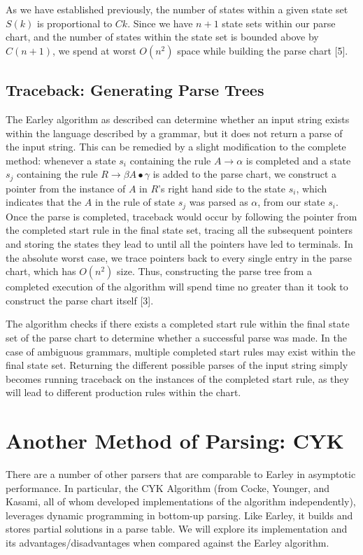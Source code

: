 \documentclass[a4paper, 11pt]{article}
\begin{document}
As we have established previously, the number of states within a given state set $S(k)$ is proportional to $Ck$. Since we have $n+1$ state sets within our parse chart, and the
number of states within the state set is bounded above by $C(n+1)$, we spend at worst $O(n^2)$ space while building the parse chart [5].

\subsection{Traceback: Generating Parse Trees}

The Earley algorithm as described can determine whether an input string exists within the language described by a grammar, but it does not return a parse of the input string.
This can be remedied by a slight modification to the complete method: whenever a state $s_i$ containing the rule $A \to \alpha$ is completed and a state $s_j$ containing the 
rule $R \to \beta A \bullet \gamma$ is added to the parse chart, we construct a pointer from the instance of $A$ in $R$'s right hand side to the state $s_i$, which indicates
that the $A$ in the rule of state $s_j$ was parsed as $\alpha$, from our state $s_i$. Once the parse is completed, traceback would occur by following the pointer from the
completed start rule in the final state set, tracing all the subsequent pointers and storing the states they lead to until all the pointers have led to terminals. 
In the absolute worst case, we trace pointers back to every single entry in the parse chart, which has $O(n^2)$ size. Thus, constructing the parse
tree from a completed execution of the algorithm will spend time no greater than it took to construct the parse chart itself [3].

The algorithm checks if there exists a completed start rule within the final state set of the parse chart to determine whether a 
successful parse was made. In the case of ambiguous grammars, multiple completed start rules may exist within the final state set. Returning the different possible parses of
the input string simply becomes running traceback on the instances of the completed start rule, as they will lead to different production rules within the chart.

\section{Another Method of Parsing: CYK}

There are a number of other parsers that are comparable to Earley in asymptotic performance. In particular, the CYK Algorithm (from Cocke, Younger, and Kasami, all of whom
developed implementations of the algorithm independently), leverages dynamic programming in bottom-up parsing. Like Earley, it builds and stores partial solutions in a parse
table. We will explore its implementation and its advantages/disadvantages when compared against the Earley algorithm.
\end{document}
